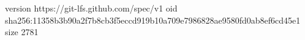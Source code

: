 version https://git-lfs.github.com/spec/v1
oid sha256:11358b3b90a2f7b8cb3f5eccd919b10a709e7986828ae9580fd0ab8ef6cd45e1
size 2781
